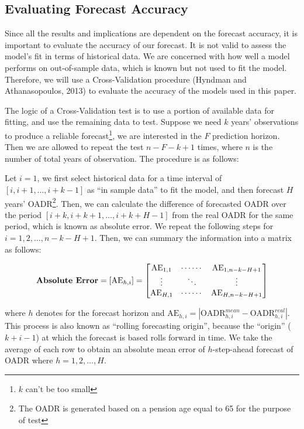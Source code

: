 \documentclass[11pt,a4paper,]{article}
\begin{document}
\subsection{Evaluating Forecast Accuracy}\label{sec:accuracy}

Since all the results and implications are dependent on the forecast
accuracy, it is important to evaluate the accuracy of our forecast. It
is not valid to assess the model's fit in terms of historical data. We
are concerned with how well a model performs on out-of-sample data,
which is known but not used to fit the model. Therefore, we will use a
Cross-Validation procedure (Hyndman and Athanasopoulos, 2013) to
evaluate the accuracy of the models used in this paper.

The logic of a Cross-Validation test is to use a portion of available
data for fitting, and use the remaining data to test. Suppose we need
\(k\) years' observations to produce a reliable
forecast\footnote{$k$ can't be too small}, we are interested in the
\(F\)  prediction horizon. Then we are allowed to
repeat the test \(n-F-k+1\)  times, where
\(n\) is the number of total years of observation. The procedure is as
follows:

Let \(i=1\), we first select historical data for a time interval of
\([i,i+1,\dots,i+k-1]\) as ``in sample data'' to fit the model, and then
forecast \(H\) years'
OADR\footnote{The OADR is generated based on a pension age equal to 65 for the purpose of test}.
Then, we can calculate the difference of forecasted OADR over the period
\([i+k,i+k+1,\dots,i+k+H-1]\) from the real OADR for the same period,
which is known as absolute error. We repeat the following steps for
\(i=1,2,\dots,n-k-H+1\). Then, we can summary the information into a
matrix as follows:

\begin{equation}
  \text{\textbf{Absolute Error}} = [\text{AE}_{h,i}] =
    \begin{bmatrix}
      \text{AE}_{1,1} & \cdots\cdots & \text{AE}_{1,n-k-H+1} \\
      \vdots          & \ddots       & \vdots \\
      \text{AE}_{H,1} & \cdots\cdots & \text{AE}_{H,n-k-H+1}
    \end{bmatrix}
\end{equation}

where \(h\) denotes for the forecast horizon and
\(\text{AE}_{h,i}=\left|\text{OADR}^{mean}_{h,i}-\text{OADR}^{real}_{h,i}\right|\).
This process is also known as ``rolling forecasting origin'', because
the ``origin'' (\(k+i-1\)) at which the forecast is based rolls forward
in time. We take the average of each row to obtain an absolute mean
error of \(h\)-step-ahead forecast of OADR where \(h=1,2,\dots,H\).
\end{document}
